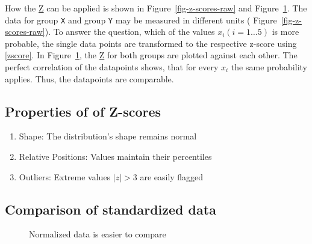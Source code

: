 \documentclass[
  a4paper,
]{scrbook}
\providecommand{\tightlist}{%
  \setlength{\itemsep}{0pt}\setlength{\parskip}{0pt}}\usepackage{longtable,booktabs,array}
\begin{document}
How the \hyperref[acronyms_Z]{Z} can be applied is shown in
Figure~\ref{fig-z-scores-raw} and Figure~\ref{fig-z-scores-scaled}. The
data for group \texttt{X} and group \texttt{Y} may be measured in
different units ( Figure~\ref{fig-z-scores-raw}). To answer the
question, which of the values \(x_i (i=1\ldots5)\) is more probable, the
single data points are transformed to the respective z-score using
\eqref{zscore}. In Figure~\ref{fig-z-scores-scaled}, the
\hyperref[acronyms_Z]{Z} for both groups are plotted against each other.
The perfect correlation of the datapoints shows, that for every \(x_i\)
the same probability applies. Thus, the datapoints are comparable.

\subsection{Properties of of Z-scores}\label{properties-of-of-z-scores}

\begin{enumerate}
\def\labelenumi{\arabic{enumi}.}
\tightlist
\item
  Shape: The distribution's shape remains normal
\item
  Relative Positions: Values maintain their percentiles
\item
  Outliers: Extreme values \(|z|>3\) are easily flagged
\end{enumerate}

\subsection{Comparison of standardized
data}\label{comparison-of-standardized-data}

\begin{figure}[ht]


\caption{\label{fig-z-scores-scaled}Normalized data is easier to
compare}

\end{figure}%
\end{document}
